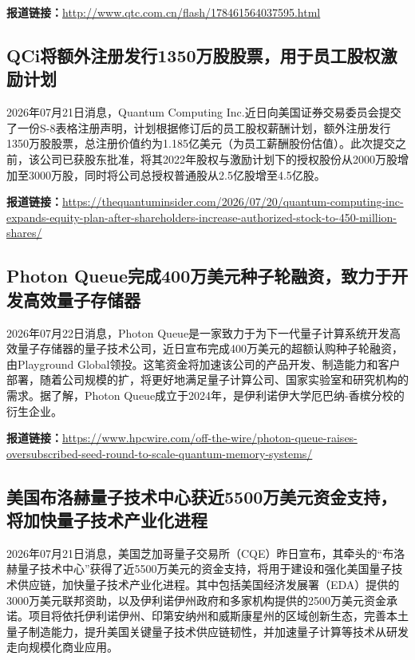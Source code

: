 \documentclass[12pt,a4paper]{ctexart}
\begin{document}
\noindent\textbf{报道链接：}\url{http://www.qtc.com.cn/flash/178461564037595.html}

\subsection{ QCi将额外注册发行1350万股股票，用于员工股权激励计划 }

2026年07月21日消息，Quantum Computing Inc.近日向美国证券交易委员会提交了一份S-8表格注册声明，计划根据修订后的员工股权薪酬计划，额外注册发行1350万股股票，总注册价值约为1.185亿美元（为员工薪酬股份估值）。此次提交之前，该公司已获股东批准，将其2022年股权与激励计划下的授权股份从2000万股增加至3000万股，同时将公司总授权普通股从2.5亿股增至4.5亿股。

\noindent\textbf{报道链接：}\url{https://thequantuminsider.com/2026/07/20/quantum-computing-inc-expands-equity-plan-after-shareholders-increase-authorized-stock-to-450-million-shares/}

\subsection{ Photon Queue完成400万美元种子轮融资，致力于开发高效量子存储器 }

2026年07月22日消息，Photon Queue是一家致力于为下一代量子计算系统开发高效量子存储器的量子技术公司，近日宣布完成400万美元的超额认购种子轮融资，由Playground Global领投。这笔资金将加速该公司的产品开发、制造能力和客户部署，随着公司规模的扩，将更好地满足量子计算公司、国家实验室和研究机构的需求。据了解，Photon Queue成立于2024年，是伊利诺伊大学厄巴纳-香槟分校的衍生企业。

\noindent\textbf{报道链接：}\url{https://www.hpcwire.com/off-the-wire/photon-queue-raises-oversubscribed-seed-round-to-scale-quantum-memory-systems/}

\subsection{ 美国布洛赫量子技术中心获近5500万美元资金支持，将加快量子技术产业化进程 }

2026年07月21日消息，美国芝加哥量子交易所（CQE）昨日宣布，其牵头的“布洛赫量子技术中心”获得了近5500万美元的资金支持，将用于建设和强化美国量子技术供应链，加快量子技术产业化进程。其中包括美国经济发展署（EDA）提供的3000万美元联邦资助，以及伊利诺伊州政府和多家机构提供的2500万美元资金承诺。项目将依托伊利诺伊州、印第安纳州和威斯康星州的区域创新生态，完善本土量子制造能力，提升美国关键量子技术供应链韧性，并加速量子计算等技术从研发走向规模化商业应用。
\end{document}
